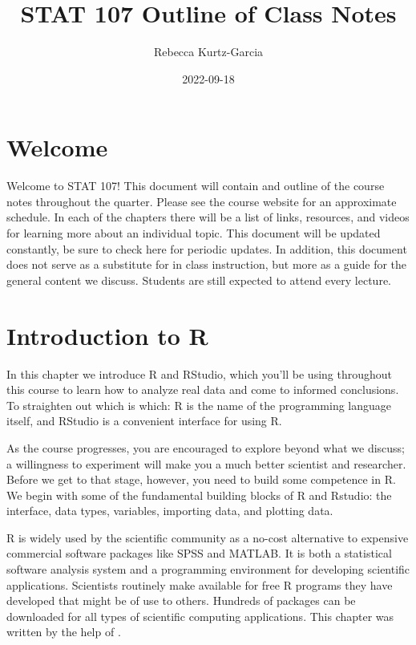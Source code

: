 \documentclass[
]{book}
\title{STAT 107 Outline of Class Notes}
\author{Rebecca Kurtz-Garcia}
\date{2022-09-18}
\begin{document}
\maketitle

{
\setcounter{tocdepth}{1}
\tableofcontents
}
\hypertarget{welcome}{%
\chapter*{Welcome}\label{welcome}}

Welcome to STAT 107! This document will contain and outline of the course notes throughout the quarter. Please see the course website for an approximate schedule. In each of the chapters there will be a list of links, resources, and videos for learning more about an individual topic. This document will be updated constantly, be sure to check here for periodic updates. In addition, this document does not serve as a substitute for in class instruction, but more as a guide for the general content we discuss. Students are still expected to attend every lecture.

\hypertarget{introduction-to-r}{%
\chapter{Introduction to R}\label{introduction-to-r}}

In this chapter we introduce R and RStudio, which you'll be using throughout this course to learn how to analyze real data and come to informed conclusions. To straighten out which is which: R is the name of the programming language itself, and RStudio is a convenient interface for using R.

As the course progresses, you are encouraged to explore beyond what we discuss; a willingness to experiment will make you a much better scientist and researcher. Before we get to that stage, however, you need to build some competence in R. We begin with some of the fundamental building blocks of R and Rstudio: the interface, data types, variables, importing data, and plotting data.

R is widely used by the scientific community as a no-cost alternative to expensive commercial software packages like SPSS and MATLAB. It is both a statistical software analysis system and a programming environment for developing scientific applications. Scientists routinely make available for free R programs they have developed that might be of use to others. Hundreds of packages can be downloaded for all types of scientific computing applications. This chapter was written by the help of \citet{Desharnais2020}.
\end{document}
